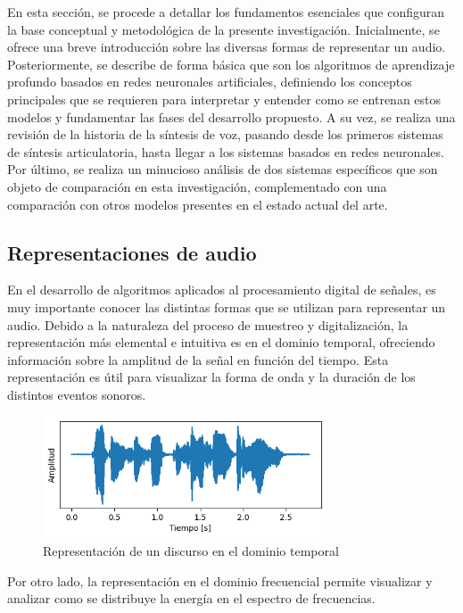 En esta sección, se procede a detallar los fundamentos esenciales que configuran la base conceptual y metodológica de la presente investigación. Inicialmente, se ofrece una breve introducción sobre las diversas formas de representar un audio. Posteriormente, se describe de forma básica que son los algoritmos de aprendizaje profundo basados en redes neuronales artificiales, definiendo los conceptos principales que se requieren para interpretar y entender como se entrenan estos modelos y fundamentar las fases del desarrollo propuesto. A su vez, se realiza una revisión de  la historia de la síntesis de voz, pasando desde los primeros sistemas de síntesis articulatoria, hasta llegar a los sistemas basados en redes neuronales. Por último, se realiza un minucioso análisis de dos sistemas específicos que son objeto de comparación en esta investigación, complementado con una comparación con otros modelos presentes en el estado actual del arte.

\subsection{Representaciones de audio}

En el desarrollo de algoritmos aplicados al procesamiento digital de señales, es muy importante conocer las distintas formas que se utilizan para representar un audio. Debido a la naturaleza del proceso de muestreo y digitalización, la representación más elemental e intuitiva es en el dominio temporal, ofreciendo información sobre la amplitud de la señal en función del tiempo. Esta representación es útil para visualizar la forma de onda y la duración de los distintos eventos sonoros. 

\begin{figure}[h]
    \centering
    \includegraphics[width=0.75\textwidth]{figures/2.1.waveform.png}
    \caption{Representación de un discurso en el dominio temporal}
    \label{fig:2.1. waveform}
\end{figure}

Por otro lado, la representación en el dominio frecuencial permite visualizar y analizar como se distribuye la energía en el espectro de frecuencias. 

